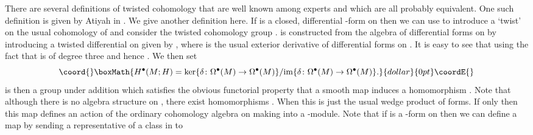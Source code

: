 \documentclass[a4paper,reqno]{amsart}
\theoremstyle{plain}
\theoremstyle{definition}
\theoremstyle{remark}
\numberwithin{equation}{section}
\numberwithin{figure}{section}
\providecommand{\<}{\langle}
\renewcommand{\>}{\rangle}
\begin{document}
There are several definitions of twisted cohomology 
that are well known among experts and which are all 
probably equivalent.  One such definition is 
given by Atiyah in \cite{Ati2}.  We give another 
definition here.   
If \coordHE{} is a closed, differential \coordHE{}-form on 
\coordHE{} then we can use \coordHE{} to introduce 
a `twist' on the usual cohomology of \coordHE{} and consider the 
twisted cohomology group \coordHE{}.   
\coordHE{} is constructed 
from the algebra \coordHE{} of differential forms 
on \coordHE{} by introducing a twisted differential \myHighlight{$\delta$}\coordHE{} on \coordHE{} 
given by \coordHE{}, where \coordHE{} is the usual exterior derivative of 
differential forms on \coordHE{}.  It is easy to see that 
\coordHE{} using the fact that \coordHE{} is of degree 
three and hence \coordHE{}.  We then set 
$$\coord{}\boxMath{ 
H^\bullet(M;H) = \text{ker}\{\delta\colon \Omega^\bullet(M) 
\to \Omega^\bullet(M)\}/\text{im}\{\delta\colon \Omega^\bullet(M) 
\to \Omega^\bullet(M)\}. 
}{dollar}{0pt}\coordE{}$$  \coordHE{} is then a group under addition which 
satisfies the obvious functorial property that a 
smooth map \coordHE{} induces a homomorphism 
\coordHE{}.   
Note that although there is no algebra structure on 
\coordHE{}, there exist homomorphisms 
\coordHE{}.  When \coordHE{} this is 
just the usual wedge product of forms.  If \coordHE{} only 
then this map defines an action of the ordinary cohomology algebra  
\coordHE{} on \coordHE{} making 
\coordHE{} into 
a \coordHE{}-module.  Note that if \myHighlight{$\lambda$}\coordHE{} is a 
\coordHE{}-form on \coordHE{} then we can define a map \coordHE{} by sending a representative 
\myHighlight{$\omega$}\coordHE{} of a class \myHighlight{$[\omega]$}\coordHE{} in \coordHE{} to 
\end{document}
